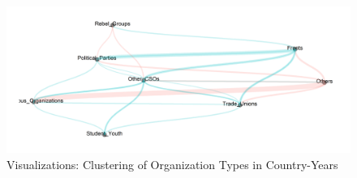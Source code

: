 \begin{figure}[!htpb]
    \centering
    \includegraphics[width = \textwidth]{img/arc_network_clusters.png}
    \caption{Visualizations: Clustering of Organization Types in Country-Years}
    \label{Fig: Clusters}
\end{figure}{}

